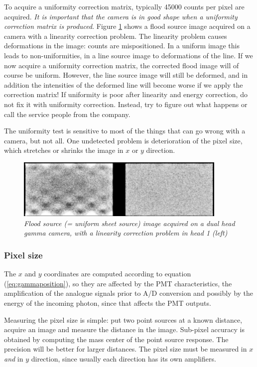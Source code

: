 \documentclass[11pt,oneside]{book}
\begin{document}
To acquire a uniformity correction matrix, typically 45000 counts per pixel
are acquired. {\em It is important that the camera is in good shape when a
uniformity correction matrix is produced}. Figure \ref{fig:qc_linproblem}
shows a flood source image acquired on a camera with a linearity correction
problem. The linearity problem causes deformations in the image: counts are
mispositioned. In a uniform image this leads to non-uniformities, in a line
source image to deformations of the line. If we now acquire a uniformity
correction matrix, the corrected flood image will of course be uniform.
However, the line source image will still be deformed, and in addition the
intensities of the deformed line will become worse if we apply the correction
matrix! If uniformity is poor after linearity and energy correction, do not
fix it with uniformity correction. Instead, try to figure out what happens or
call the service people from the company.

The uniformity test is sensitive to most of the things that can go wrong with
a camera, but not all. One undetected problem is deterioration of the pixel
size, which stretches or shrinks the image in $x$ or $y$ direction.

\begin{figure}[tb]
\centering
\includegraphics[width=0.9\textwidth]{figs/fig_qc_linproblem.pdf}
\caption{\label{fig:qc_linproblem} \emph{Flood source (= uniform sheet source)
image acquired on a dual head gamma camera, with a linearity correction
problem in head 1 (left)}}
\end{figure}

\subsubsection{Pixel size}
The $x$ and $y$ coordinates are computed according to equation
(\ref{eq:gammaposition}), so they are affected by the PMT characteristics, the
amplification of the analogue signals prior to A/D conversion and possibly by
the energy of the incoming photon, since that affects the PMT outputs.

Measuring the pixel size is simple: put two point sources at a known distance,
acquire an image and measure the distance in the image. Sub-pixel accuracy is
obtained by computing the mass center of the point source response. The
precision will be better for larger distances. The pixel size must be measured
in $x$ {\em and} in $y$ direction, since usually each direction has its own
amplifiers.
\end{document}

